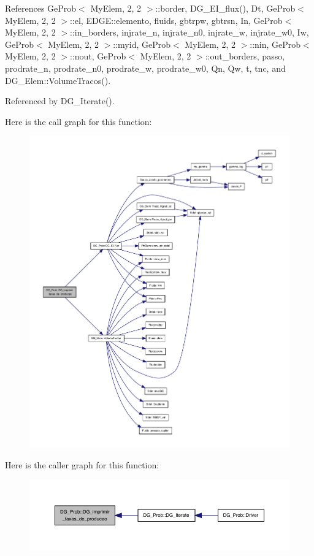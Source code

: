 References Ge\+Prob$<$ My\+Elem, 2, 2 $>$\+::border, D\+G\+\_\+\+E\+I\+\_\+flux(), Dt, Ge\+Prob$<$ My\+Elem, 2, 2 $>$\+::el, E\+D\+G\+E\+::elemento, fluids, gbtrpw, gbtrsn, In, Ge\+Prob$<$ My\+Elem, 2, 2 $>$\+::in\+\_\+borders, injrate\+\_\+n, injrate\+\_\+n0, injrate\+\_\+w, injrate\+\_\+w0, Iw, Ge\+Prob$<$ My\+Elem, 2, 2 $>$\+::myid, Ge\+Prob$<$ My\+Elem, 2, 2 $>$\+::nin, Ge\+Prob$<$ My\+Elem, 2, 2 $>$\+::nout, Ge\+Prob$<$ My\+Elem, 2, 2 $>$\+::out\+\_\+borders, passo, prodrate\+\_\+n, prodrate\+\_\+n0, prodrate\+\_\+w, prodrate\+\_\+w0, Qn, Qw, t, tnc, and D\+G\+\_\+\+Elem\+::\+Volume\+Tracos().



Referenced by D\+G\+\_\+\+Iterate().

Here is the call graph for this function\+:
\nopagebreak
\begin{figure}[H]
\begin{center}
\leavevmode
\includegraphics[width=350pt]{classDG__Prob_afd8b8c1330587f232b2f1bd9f9cc8a38_cgraph}
\end{center}
\end{figure}
Here is the caller graph for this function\+:
\nopagebreak
\begin{figure}[H]
\begin{center}
\leavevmode
\includegraphics[width=350pt]{classDG__Prob_afd8b8c1330587f232b2f1bd9f9cc8a38_icgraph}
\end{center}
\end{figure}
